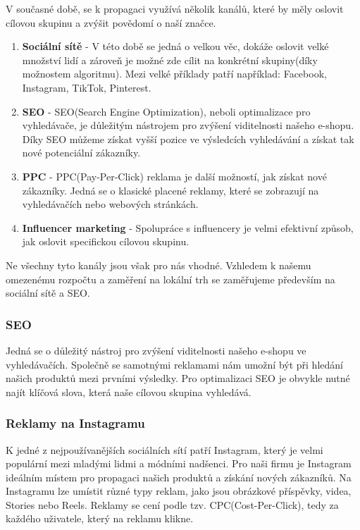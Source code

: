 \documentclass[12pt, a4paper]{article}
\begin{document}
V současné době, se k propagaci využívá
několik kanálů, které by měly oslovit cílovou skupinu a zvýšit povědomí o naší značce.

\begin{enumerate}
  \item \textbf{Sociální sítě} - V této době se jedná o velkou věc,
  dokáže oslovit velké množství lidí a zároveň je možné zde cílit na konkrétní skupiny(díky možnostem algoritmu).
  Mezi velké příklady patří například: Facebook, Instagram, TikTok, Pinterest.
  \item \textbf{SEO} - SEO(Search Engine Optimization), neboli optimalizace pro vyhledávače, je důležitým nástrojem pro zvýšení viditelnosti našeho e-shopu.
  Díky SEO můžeme získat vyšší pozice ve výsledcích vyhledávání a získat tak nové potenciální zákazníky.
  \item \textbf{PPC} - PPC(Pay-Per-Click) reklama je další možností, jak získat nové zákazníky.
  Jedná se o klasické placené reklamy, které se zobrazují na vyhledávačích nebo webových stránkách.
  \item \textbf{Influencer marketing} - Spolupráce s influencery je velmi efektivní způsob, jak oslovit specifickou cílovou skupinu.
\end{enumerate}

Ne všechny tyto kanály jsou však pro nás vhodné. Vzhledem k našemu omezenému rozpočtu a zaměření na lokální trh se zaměřujeme především na sociální sítě a SEO.

\subsubsection{SEO}

Jedná se o důležitý nástroj pro zvýšení viditelnosti našeho e-shopu ve vyhledávačích.
Společně se samotnými reklamami nám umožní být při hledání našich produktů mezi prvními výsledky.
Pro optimalizaci SEO je obvykle nutné najít klíčová slova, která naše cílovou skupina vyhledává.

\subsubsection{Reklamy na Instagramu}

K jedné z nejpoužívanějších sociálních sítí patří Instagram, který je velmi populární mezi mladými lidmi a módními nadšenci.
Pro naši firmu je Instagram ideálním místem pro propagaci našich produktů a získání nových zákazníků.
Na Instagramu lze umístit různé typy reklam, jako jsou obrázkové příspěvky, videa, Stories nebo Reels.
Reklamy se cení podle tzv. CPC(Cost-Per-Click), tedy za každého uživatele, který na reklamu klikne.
\end{document}
